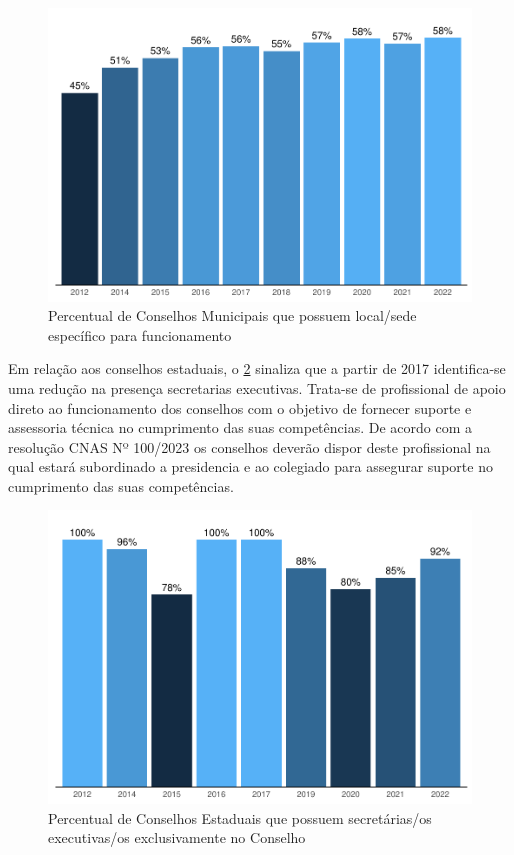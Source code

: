 \documentclass[
  brazilian]{report}
\begin{document}
\begin{figure}
\includegraphics{Censo-SUAS-2022_files/figure-latex/cmas_sede-1} \caption[Percentual de Conselhos Municipais que possuem local/sede específico para funcionamento]{Percentual de Conselhos Municipais que possuem local/sede específico para funcionamento}\label{fig:cmas_sede}
\end{figure}

Em relação aos conselhos estaduais, o \cref{fig:ceas_se} sinaliza que a
partir de 2017 identifica-se uma redução na presença secretarias
executivas. Trata-se de profissional de apoio direto ao funcionamento
dos conselhos com o objetivo de fornecer suporte e assessoria técnica no
cumprimento das suas competências. De acordo com a resolução CNAS Nº
100/2023 os conselhos deverão dispor deste profissional na qual estará
subordinado a presidencia e ao colegiado para assegurar suporte no
cumprimento das suas competências.

\begin{figure}
\includegraphics{Censo-SUAS-2022_files/figure-latex/ceas_se-1} \caption[Percentual de Conselhos Estaduais que possuem secretárias/os executivas/os exclusivamente no Conselho]{Percentual de Conselhos Estaduais que possuem secretárias/os executivas/os exclusivamente no Conselho}\label{fig:ceas_se}
\end{figure}
\end{document}
